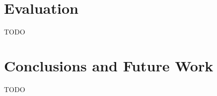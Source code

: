 \documentclass[letterpaper,twocolumn,10pt]{article}
\begin{document}




\section{Evaluation}
TODO

\section{Conclusions and Future Work}
TODO


\end{document}
